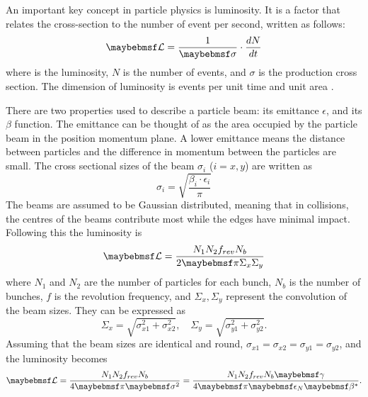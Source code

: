 An important key concept in particle physics is luminosity. It is a factor that relates the cross-section to the number of event per second, written as follows:
$$\luminosity=\dfrac{1}{\sigma}\cdot\dfrac{dN}{dt}$$
where \luminosity is the luminosity, $N$ is the number of events, and $\sigma$ is the production cross section. The dimension of luminosity is events per unit time and unit area \unit{}{\cm\rpsquared}\unit{}{\second\rp}.

There are two properties used to describe a particle beam: its  emittance $\epsilon$, and its $\beta$ function. The emittance can be thought of as the area occupied by the particle beam in the position momentum plane. A lower emittance means the distance between particles and the difference in momentum between the particles are small. The cross sectional sizes of the beam $\sigma_i$ ($i=x,y$) are written as 
$$\sigma_i=\sqrt{\dfrac{\beta_i\cdot\epsilon_i}{\pi}}$$ The beams are assumed to be Gaussian distributed, meaning that in collisions, the centres of the beams contribute most while the edges have minimal impact. Following this the luminosity is
$$\luminosity=\dfrac{N_1N_2f_{rev}N_b}{2\pi\Sigma_x\Sigma_y}$$
where $N_1$ and $N_2$ are the number of particles for each bunch, $N_b$ is the number of bunches, $f$ is the revolution frequency, and $\Sigma_x,\Sigma_y$ represent the  convolution of the beam sizes. They can be expressed as
$$\Sigma_x=\sqrt{\sigma_{x1}^2+\sigma_{x2}^2}, \quad \Sigma_y=\sqrt{\sigma_{y1}^2+\sigma_{y2}^2}.$$
Assuming that the beam sizes are identical and round, $\sigma_{x1}=\sigma_{x2}=\sigma_{y1}=\sigma_{y2}$, and the luminosity becomes
$$\luminosity=\dfrac{N_1N_2f_{rev}N_b}{4\pi\sigma^2}=\dfrac{N_1N_2f_{rev}N_b\gamma}{4\pi\epsilon_N\beta^*}.$$

